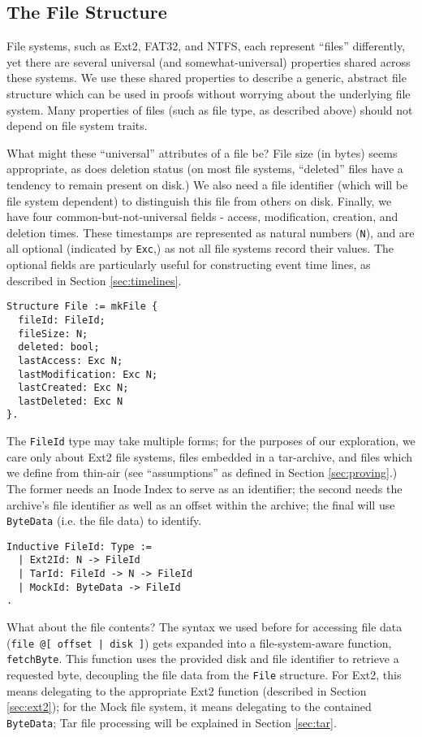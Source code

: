 \documentclass[nocopyrightspace]{sigplanconf}
\begin{document}
\subsection{The File Structure}

File systems, such as Ext2, FAT32, and NTFS, each represent ``files''
differently, yet there are several universal (and somewhat-universal)
properties shared across these systems. We use these shared properties to
describe a generic, abstract file structure which can be used in proofs
without worrying about the underlying file system. Many properties of files
(such as file type, as described above) should not depend on file system
traits.

What might these ``universal'' attributes of a file be? File size (in bytes)
seems appropriate, as does deletion status (on most file systems, ``deleted''
files have a tendency to remain present on disk.) We also need a file
identifier (which will be file system dependent) to distinguish this file from
others on disk. Finally, we have four common-but-not-universal fields -
access, modification, creation, and deletion times. These timestamps are
represented as natural numbers ({\tt N}), and are all optional (indicated by
{\tt Exc},) as not all file systems record their values. The optional fields
are particularly useful for constructing event time lines, as described in
Section \ref{sec:timelines}.

\begin{lstlisting}
Structure File := mkFile {
  fileId: FileId;
  fileSize: N;
  deleted: bool;
  lastAccess: Exc N;
  lastModification: Exc N;
  lastCreated: Exc N;
  lastDeleted: Exc N
}.
\end{lstlisting}

The {\tt FileId} type may take multiple forms; for the purposes of our
exploration, we care only about Ext2 file systems, files embedded in a
tar-archive, and files which we define from thin-air (see ``assumptions'' as
defined in Section \ref{sec:proving}.) The former needs an Inode Index to
serve as an identifier; the second needs the archive's file identifier as well
as an offset within the archive; the final will use {\tt ByteData} (i.e.  the
file data) to identify.

\begin{lstlisting}
Inductive FileId: Type :=
  | Ext2Id: N -> FileId
  | TarId: FileId -> N -> FileId
  | MockId: ByteData -> FileId
.
\end{lstlisting}

What about the file contents? The syntax we used before for accessing file
data ({\tt file @[ offset | disk ]}) gets expanded into a file-system-aware
function, {\tt fetchByte}. This function uses the provided disk and file
identifier to retrieve a requested byte, decoupling the file data from the
{\tt File} structure. For Ext2, this means delegating to the appropriate Ext2
function (described in Section \ref{sec:ext2}); for the Mock file system, it
means delegating to the contained {\tt ByteData}; Tar file processing will be
explained in Section \ref{sec:tar}.
\end{document}
